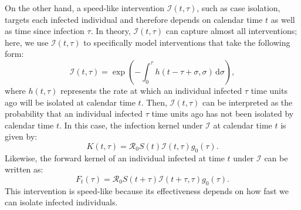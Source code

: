 \documentclass[12pt]{article}
\newcommand{\Rx}[1]{\ensuremath{{\mathcal R}_{#1}}\xspace}
\newcommand{\Ro}{\Rx{0}}
\newcommand{\dd}[1]{\ensuremath{\, \mathrm{d}#1}}
\newcommand{\dsigma}{\dd{\sigma}}
\newcommand{\II}{{\mathcal I}}
\begin{document}
On the other hand, a speed-like intervention $\II(t, \tau)$, such as case isolation, targets each infected individual and therefore depends on calendar time $t$ as well as time since infection $\tau$.
In theory, $\II(t, \tau)$ can capture almost all interventions; here, we use $\II(t, \tau)$ to specifically model interventions that take the following form:
\begin{equation}
\II(t, \tau) = \exp \left(- \int_0^\tau h(t-\tau+\sigma, \sigma) \dsigma \right),
\end{equation}
where $h(t, \tau)$ represents the rate at which an individual infected $\tau$ time units ago will be isolated at calendar time $t$.
Then, $\II(t,\tau)$ can be interpreted as the probability that an individual infected $\tau$ time units ago has not been isolated by calendar time $t$.
In this case, the infection kernel under $\II$ at calendar time $t$ is given by:
\begin{equation}
K(t, \tau) = \Ro S(t) \II(t, \tau) g_0(\tau).
\end{equation}
Likewise, the forward kernel of an individual infected at time $t$ under $\II$ can be written as:
\begin{equation}
F_t(\tau) = \Ro S(t+\tau) \II(t+\tau, \tau) g_0(\tau).
\end{equation}
This intervention is speed-like because its effectiveness depends on how fast we can isolate infected individuals.
\end{document}
